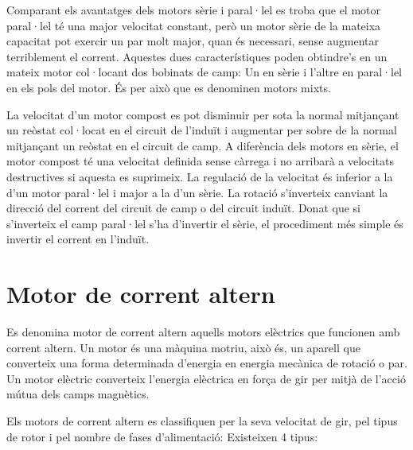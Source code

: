 Comparant els avantatges dels motors sèrie i paral·lel es troba que el motor paral·lel té una major velocitat constant, però un motor sèrie de la mateixa capacitat pot exercir un par molt major, quan és necessari, sense augmentar terriblement el corrent. Aquestes dues característiques poden obtindre's en un mateix motor col·locant dos bobinats de camp: Un en sèrie i l'altre en paral·lel en els pols del motor. És per això que es denominen motors mixts. 

La velocitat d'un motor compost es pot disminuir per sota la normal \newline mitjançant un reòstat col·locat en el circuit de l'induït i augmentar per sobre de la normal mitjançant un reòstat en el circuit de camp. A diferència dels motors en sèrie, el motor compost té una velocitat definida sense càrrega i no arribarà a velocitats destructives si aquesta es suprimeix. La regulació de la velocitat és inferior a la d'un motor paral·lel i major a la d'un sèrie. La rotació s'inverteix canviant la direcció del corrent del circuit de camp o del circuit induït. Donat que si s'inverteix el camp paral·lel s'ha d'invertir el sèrie, el procediment més simple és invertir el corrent en l'induït.

\section{Motor de corrent altern}

Es denomina motor de corrent altern aquells motors elèctrics que funcionen amb corrent altern. Un motor és una màquina motriu, això és, un aparell que converteix una forma determinada d'energia en energia mecànica de rotació o par. Un motor elèctric converteix l'energia elèctrica en força de gir per mitjà de l'acció mútua dels camps magnètics.

Els motors de corrent altern es classifiquen per la seva velocitat de gir, pel tipus de rotor i pel nombre de fases d'alimentació:
Existeixen 4 tipus:

